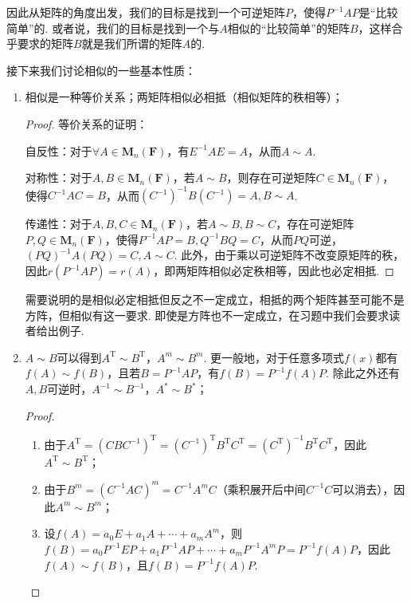 因此从矩阵的角度出发，我们的目标是找到一个可逆矩阵$P$，使得$P^{-1}AP$是``比较简单''的. 或者说，我们的目标是找到一个与$A$相似的``比较简单''的矩阵$B$，这样合乎要求的矩阵$B$就是我们所谓的矩阵$A$的.

接下来我们讨论相似的一些基本性质：
\begin{enumerate}
    \item 相似是一种等价关系；两矩阵相似必相抵（相似矩阵的秩相等）；

          \begin{proof}
              等价关系的证明：

              自反性：对于$\forall A \in \mathbf{M}_n(\mathbf{F})$，有$E^{-1}AE=A$，从而$A \sim A$.

              对称性：对于$A,B\in \mathbf{M}_n(\mathbf{F})$，若$A\sim B$，则存在可逆矩阵$C \in \mathbf{M}_n(\mathbf{F})$，
              使得$C^{-1}AC=B$，从而$(C^{-1})^{-1}B(C^{-1})=A,B \sim A$.

              传递性：对于$A,B,C \in \mathbf{M}_n(\mathbf{F})$，若$A\sim B,B\sim C$，存在可逆矩阵$P,Q \in \mathbf{M}_n(\mathbf{F})$，使得$P^{-1}AP=B,Q^{-1}BQ=C$，从而$PQ$可逆，$(PQ)^{-1}A(PQ)=C,A\sim C$.
              此外，由于乘以可逆矩阵不改变原矩阵的秩，因此$r(P^{-1}AP)=r(A)$，即两矩阵相似必定秩相等，因此也必定相抵.
          \end{proof}

          需要说明的是相似必定相抵但反之不一定成立，相抵的两个矩阵甚至可能不是方阵，但相似有这一要求. 即使是方阵也不一定成立，在习题中我们会要求读者给出例子.

    \item $A\sim B$可以得到$A^\mathrm{T}\sim B^\mathrm{T}$，$A^m\sim B^m$. 更一般地，对于任意多项式$f(x)$都有$f(A)\sim f(B)$，且若$B=P^{-1}AP$，有$f(B)=P^{-1}f(A)P$. 除此之外还有$A,B$可逆时，$A^{-1}\sim B^{-1}$，$A^*\sim B^*$；

          \begin{proof}
              \begin{enumerate}
                  \item 由于$A^\mathrm{T}=(CBC^{-1})^\mathrm{T}=(C^{-1})^\mathrm{T}B^\mathrm{T}C^\mathrm{T}=(C^\mathrm{T})^{-1}B^\mathrm{T}C^\mathrm{T}$，因此$A^\mathrm{T}\sim B^\mathrm{T}$；

                  \item 由于$B^m=(C^{-1}AC)^m=C^{-1}A^mC$（乘积展开后中间$C^{-1}C$可以消去），因此$A^m\sim B^m$；

                  \item 设$f(A)=a_0E+a_1A+\cdots+a_mA^m$，则$f(B)=a_0P^{-1}EP+a_1P^{-1}AP+\cdots+a_mP^{-1}A^mP=P^{-1}f(A)P$，因此$f(A)\sim f(B)$，且$f(B)=P^{-1}f(A)P$.


\end{enumerate}
\end{proof}
\end{enumerate}
